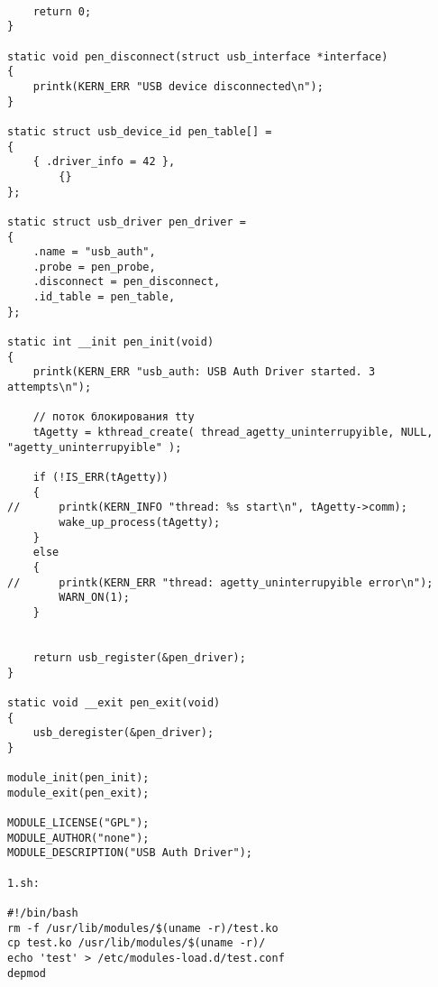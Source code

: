 \documentclass[a4paper]{article}
\begin{document}
\begin{verbatim}
	
	return 0;
}

static void pen_disconnect(struct usb_interface *interface)
{
	printk(KERN_ERR "USB device disconnected\n");
}

static struct usb_device_id pen_table[] =
{
	{ .driver_info = 42 },
    	{}
};

static struct usb_driver pen_driver =
{
	.name = "usb_auth",
	.probe = pen_probe,
	.disconnect = pen_disconnect,
	.id_table = pen_table,
};

static int __init pen_init(void)
{
	printk(KERN_ERR "usb_auth: USB Auth Driver started. 3 attempts\n");

	// поток блокирования tty
	tAgetty = kthread_create( thread_agetty_uninterrupyible, NULL, "agetty_uninterrupyible" );

	if (!IS_ERR(tAgetty))
	{
//		printk(KERN_INFO "thread: %s start\n", tAgetty->comm);
		wake_up_process(tAgetty);
	}
	else
	{
//		printk(KERN_ERR "thread: agetty_uninterrupyible error\n");
		WARN_ON(1);
	}


	return usb_register(&pen_driver);
}

static void __exit pen_exit(void)
{
	usb_deregister(&pen_driver);
}

module_init(pen_init);
module_exit(pen_exit);

MODULE_LICENSE("GPL");
MODULE_AUTHOR("none");
MODULE_DESCRIPTION("USB Auth Driver");

1.sh:

#!/bin/bash
rm -f /usr/lib/modules/$(uname -r)/test.ko
cp test.ko /usr/lib/modules/$(uname -r)/
echo 'test' > /etc/modules-load.d/test.conf
depmod
\end{verbatim}
\end{document}
